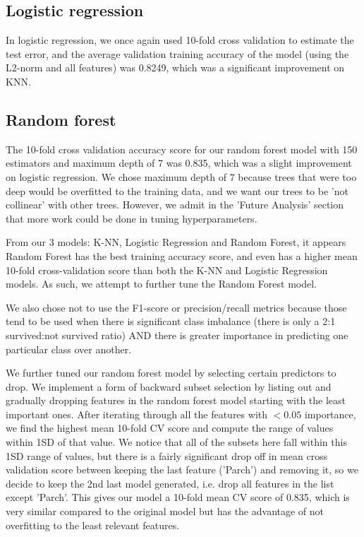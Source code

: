 \documentclass[12pt]{article}
\begin{document}
\subsection{Logistic regression}

In logistic regression, we once again used 10-fold cross validation to estimate the test error, and the average validation training accuracy of the model (using the L2-norm and all features) was 0.8249, which was a significant improvement on KNN.\newline

\subsection{Random forest}

The 10-fold cross validation accuracy score for our random forest model with 150 estimators and maximum depth of 7 was 0.835, which was a slight improvement on logistic regression. We chose maximum depth of 7 because trees that were too deep would be overfitted to the training data, and we want our trees to be 'not collinear' with other trees. However, we admit in the 'Future Analysis' section that more work could be done in tuning hyperparameters.\newline

From our 3 models: K-NN, Logistic Regression and Random Forest, it appears Random Forest has the best training accuracy score, and even has a higher mean 10-fold cross-validation score than both the K-NN and Logistic Regression models. As such, we attempt to further tune the Random Forest model.\newline

We also chose not to use the F1-score or precision/recall metrics because those tend to be used when there is significant class imbalance (there is only a 2:1 survived:not survived ratio) AND there is greater importance in predicting one particular class over another.\newline

We further tuned our random forest model by selecting certain predictors to drop. We implement a form of backward subset selection by listing out and gradually dropping features in the random forest model starting with the least important ones. After iterating through all the features with $<0.05$ importance, we find the highest mean 10-fold CV score and compute the range of values within 1SD of that value. We notice that all of the subsets here fall within this 1SD range of values, but there is a fairly significant drop off in mean cross validation score between keeping the last feature ('Parch') and removing it, so we decide to keep the 2nd last model generated, i.e. drop all features in the list except 'Parch'. This gives our model a 10-fold mean CV score of 0.835, which is very similar compared to the original model but has the advantage of not overfitting to the least relevant features.\newline
\end{document}
